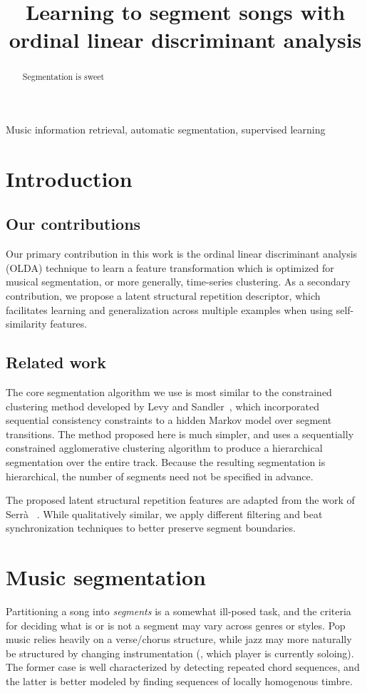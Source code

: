 \documentclass{article}
\title{Learning to segment songs with ordinal linear discriminant analysis}
\begin{document}
%
\maketitle
%
\begin{abstract}
Segmentation is sweet
\end{abstract}
%
\begin{keywords}
Music information retrieval, automatic segmentation, supervised learning
\end{keywords}
%
\section{Introduction}
\label{sec:intro}

\subsection{Our contributions}
Our primary contribution in this work is the ordinal linear discriminant analysis (OLDA) technique to learn a 
feature transformation which is optimized for musical segmentation, or more generally, time-series clustering.
As a secondary contribution, we propose a latent structural repetition descriptor, which facilitates learning and
generalization across multiple examples when using self-similarity features.

\subsection{Related work}
\label{sec:related}

The core segmentation algorithm we use is most similar to the constrained clustering method developed by Levy and
Sandler~\cite{levy2008structural}, which incorporated sequential consistency constraints to a hidden Markov model over
segment transitions. The method proposed here is much simpler, and uses a sequentially constrained agglomerative
clustering algorithm to produce a hierarchical segmentation over the entire track.  Because the
resulting segmentation is hierarchical, the number of segments need not be specified in advance.

The proposed latent structural repetition features are adapted from the work of Serr\`{a}
\etal~\cite{serra2012unsupervised}. While qualitatively similar, we apply different filtering and
beat synchronization techniques to better preserve segment boundaries.

\section{Music segmentation}
\label{sec:features}
Partitioning a song into \emph{segments} is a somewhat ill-posed task, and the criteria for deciding what is or
is not a segment may vary across genres or styles.  Pop music relies heavily on a verse/chorus structure, while jazz
may more naturally be structured by changing instrumentation (\ie, which player is currently soloing).  
The former case is well characterized by detecting repeated chord sequences, and the latter is better modeled
by finding sequences of locally homogenous timbre.
\end{document}
